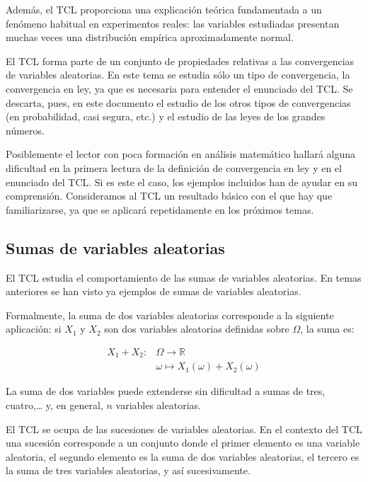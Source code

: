 \documentclass[
  a4paper,
  DIV=11,
  numbers=noendperiod]{scrreprt}
\begin{document}
Además, el TCL proporciona una explicación teórica fundamentada a un
fenómeno habitual en experimentos reales: las variables estudiadas
presentan muchas veces una distribución empírica aproximadamente normal.

El TCL forma parte de un conjunto de propiedades relativas a las
convergencias de variables aleatorias. En este tema se estudia sólo un
tipo de convergencia, la convergencia en ley, ya que es necesaria para
entender el enunciado del TCL. Se descarta, pues, en este documento el
estudio de los otros tipos de convergencias (en probabilidad, casi
segura, etc.) y el estudio de las leyes de los grandes números.

Posiblemente el lector con poca formación en análisis matemático hallará
alguna dificultad en la primera lectura de la definición de convergencia
en ley y en el enunciado del TCL. Si es este el caso, los ejemplos
incluidos han de ayudar en su comprensión. Consideramos al TCL un
resultado básico con el que hay que familiarizarse, ya que se aplicará
repetidamente en los próximos temas.

\subsection{Sumas de variables
aleatorias}\label{sumas-de-variables-aleatorias}

El TCL estudia el comportamiento de las sumas de variables aleatorias.
En temas anteriores se han visto ya ejemplos de sumas de variables
aleatorias.

Formalmente, la suma de dos variables aleatorias corresponde a la
siguiente aplicación: si \(X_{1}\) y \(X_{2}\) son dos variables
aleatorias definidas sobre \(\Omega\), la suma es:

\[
\begin{aligned}
X_{1}+X_{2}: & \Omega \rightarrow \mathbb{R} \\
& \omega \mapsto X_{1}(\omega)+X_{2}(\omega)
\end{aligned}
\]

La suma de dos variables puede extenderse sin dificultad a sumas de
tres, cuatro,\ldots{} y, en general, \(n\) variables aleatorias.

El TCL se ocupa de las sucesiones de variables aleatorias. En el
contexto del TCL una sucesión corresponde a un conjunto donde el primer
elemento es una variable aleatoria, el segundo elemento es la suma de
dos variables aleatorias, el tercero es la suma de tres variables
aleatorias, y así sucesivamente.
\end{document}
